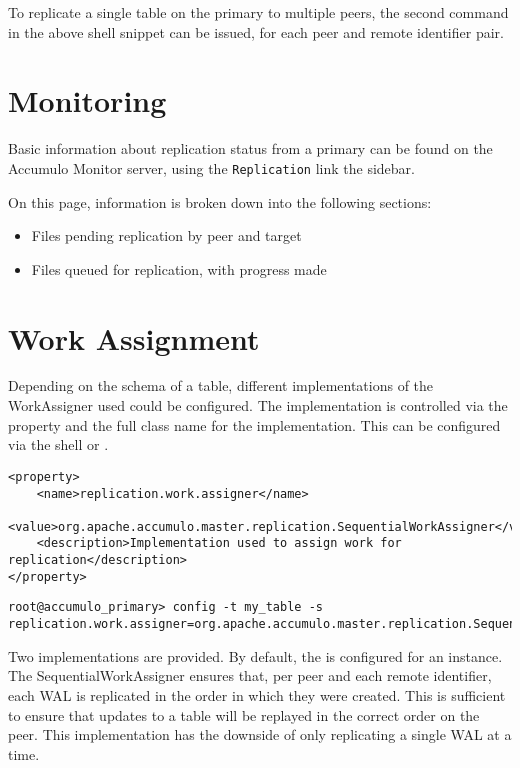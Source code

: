 To replicate a single table on the primary to multiple peers, the second command
in the above shell snippet can be issued, for each peer and remote identifier pair.

\section{Monitoring}

Basic information about replication status from a primary can be found on the Accumulo
Monitor server, using the \texttt{Replication} link the sidebar.

On this page, information is broken down into the following sections:

\begin{itemize}
    \item Files pending replication by peer and target
    \item Files queued for replication, with progress made
\end{itemize}

\section{Work Assignment}

Depending on the schema of a table, different implementations of the WorkAssigner used could
be configured. The implementation is controlled via the property 
and the full class name for the implementation. This can be configured via the shell or
.

\begingroup\fontsize{8pt}{8pt}\selectfont\begin{verbatim}
<property>
    <name>replication.work.assigner</name>
    <value>org.apache.accumulo.master.replication.SequentialWorkAssigner</value>
    <description>Implementation used to assign work for replication</description>
</property>
\end{verbatim}\endgroup

\begingroup\fontsize{8pt}{8pt}\selectfont\begin{verbatim}
root@accumulo_primary> config -t my_table -s replication.work.assigner=org.apache.accumulo.master.replication.SequentialWorkAssigner
\end{verbatim}\endgroup

Two implementations are provided. By default, the  is configured for an
instance. The SequentialWorkAssigner ensures that, per peer and each remote identifier, each WAL is
replicated in the order in which they were created. This is sufficient to ensure that updates to a table
will be replayed in the correct order on the peer. This implementation has the downside of only replicating
a single WAL at a time.

